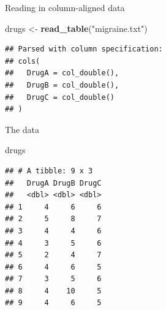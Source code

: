 \documentclass[
  ignorenonframetext,
]{beamer}
\newenvironment{Shaded}{\begin{snugshade}}{\end{snugshade}}
\newcommand{\KeywordTok}[1]{\textcolor[rgb]{0.13,0.29,0.53}{\textbf{#1}}}
\newcommand{\NormalTok}[1]{#1}
\newcommand{\StringTok}[1]{\textcolor[rgb]{0.31,0.60,0.02}{#1}}
\begin{document}
\begin{frame}[fragile]{Reading in column-aligned data}
\protect\hypertarget{reading-in-column-aligned-data}{}

\begin{Shaded}
\begin{Highlighting}[]
\NormalTok{drugs <-}\StringTok{ }\KeywordTok{read_table}\NormalTok{(}\StringTok{"migraine.txt"}\NormalTok{)}
\end{Highlighting}
\end{Shaded}

\begin{verbatim}
## Parsed with column specification:
## cols(
##   DrugA = col_double(),
##   DrugB = col_double(),
##   DrugC = col_double()
## )
\end{verbatim}

\end{frame}

\begin{frame}[fragile]{The data}
\protect\hypertarget{the-data-1}{}

\begin{Shaded}
\begin{Highlighting}[]
\NormalTok{drugs}
\end{Highlighting}
\end{Shaded}

\begin{verbatim}
## # A tibble: 9 x 3
##   DrugA DrugB DrugC
##   <dbl> <dbl> <dbl>
## 1     4     6     6
## 2     5     8     7
## 3     4     4     6
## 4     3     5     6
## 5     2     4     7
## 6     4     6     5
## 7     3     5     6
## 8     4    10     5
## 9     4     6     5
\end{verbatim}

\end{frame}
\end{document}
